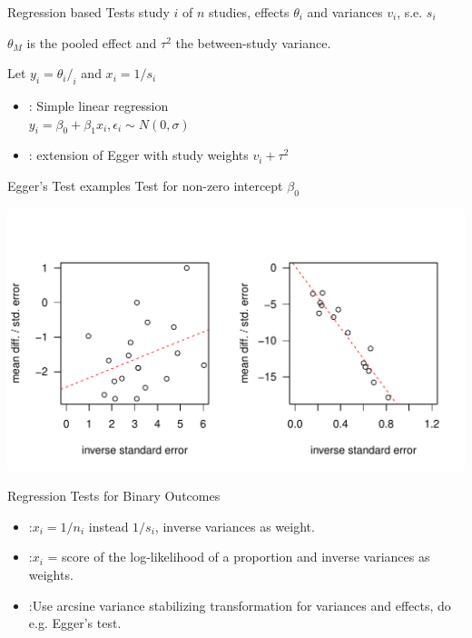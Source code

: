 \documentclass[english]{beamer}\usepackage[]{graphicx}\usepackage[]{color}
\makeatletter
\def\maxwidth{ %
  \ifdim\Gin@nat@width>\linewidth
    \linewidth
  \else
    \Gin@nat@width
  \fi
}
\newenvironment{knitrout}{}{} %
\makeatother
\begin{document}
\begin{frame}{Regression based Tests}
study $i$ of $n$ studies, effects $\theta_i$ and variances $v_i$, s.e. $s_i$

$\theta_M$ is the pooled effect and $\tau^2$ the between-study variance.

Let $y_{i} = \theta_{i}/_{i}$ and $x_i = 1/s_i$
\begin{itemize}
\item \citet{Egger} : Simple linear regression \\ $y_i = \beta_0 + \beta_1 x_i, \epsilon_i \sim N(0, \sigma)$
\item \citet{thompson.sharp} : extension of Egger with study weights $v_{i} + \tau^2$ 
\end{itemize}

\end{frame}

\begin{frame}[fragile]{Egger's Test examples}
Test for non-zero intercept $\beta_{0}$

\vspace{-1.1cm}
\begin{knitrout}
\color{fgcolor}
\includegraphics[width=\maxwidth]{figure/unnamed-chunk-4-1} 

\end{knitrout}
\end{frame}


\begin{frame}{Regression Tests for Binary Outcomes}

\begin{itemize}
\item \citet{Peters} :$x_i = 1/n_i$ instead $1/s_i$, inverse variances as weight.
\item \citet{Harbord} :$x_i$ = score of the log-likelihood of a proportion and inverse variances as weights.
\item \citet{Rucker} :Use arcsine variance stabilizing transformation for variances and effects, do e.g. Egger's test.
\end{itemize}
\end{frame}
\end{document}
